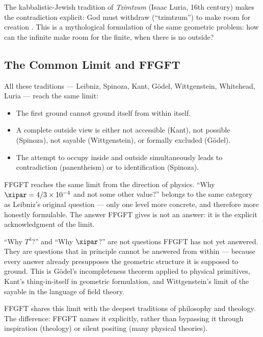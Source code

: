 The kabbalistic-Jewish tradition of \emph{Tzimtzum} (Isaac Luria, 16th century) makes the contradiction explicit: God must withdraw (``tzimtzum'') to make room for creation \cite{Scholem1941}. This is a mythological formulation of the same geometric problem: how can the infinite make room for the finite, when there is no outside?

\subsection{The Common Limit and FFGFT}

All these traditions --- Leibniz, Spinoza, Kant, Gödel, Wittgenstein, Whitehead, Luria --- reach the same limit:

\begin{itemize}
  \item The first ground cannot ground itself from within itself.
  \item A complete outside view is either not accessible (Kant), not possible (Spinoza), not sayable (Wittgenstein), or formally excluded (Gödel).
  \item The attempt to occupy inside and outside simultaneously leads to contradiction (panentheism) or to identification (Spinoza).
\end{itemize}

FFGFT reaches the same limit from the direction of physics. ``Why $\xipar = 4/3 \times 10^{-4}$ and not some other value?'' belongs to the same category as Leibniz's original question --- only one level more concrete, and therefore more honestly formulable. The answer FFGFT gives is not an answer: it is the explicit acknowledgment of the limit.

\begin{erkenntnis}
``Why $T^4$?'' and ``Why $\xipar$?'' are not questions FFGFT has not yet answered. They are questions that in principle cannot be answered from within --- because every answer already presupposes the geometric structure it is supposed to ground. This is Gödel's incompleteness theorem applied to physical primitives, Kant's thing-in-itself in geometric formulation, and Wittgenstein's limit of the sayable in the language of field theory.

FFGFT shares this limit with the deepest traditions of philosophy and theology. The difference: FFGFT names it explicitly, rather than bypassing it through inspiration (theology) or silent positing (many physical theories).
\end{erkenntnis}

